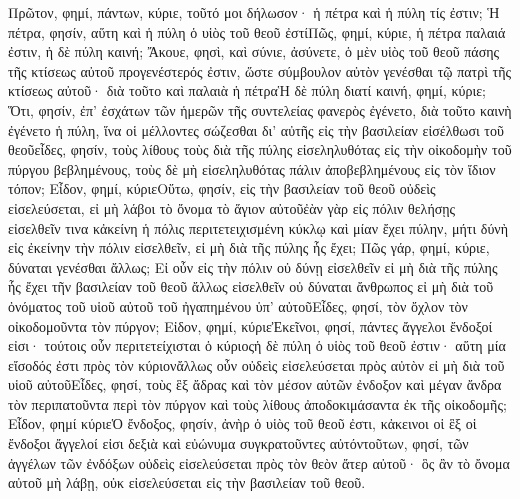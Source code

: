 Πρῶτον, φημί, πάντων, κύριε, τοῦτό μοι δήλωσον· ἡ πέτρα καὶ ἡ πύλη τίς ἐστιν; Ἡ πέτρα, φησίν, αὕτη καὶ ἡ πύλη ὁ υἱὸς τοῦ θεοῦ ἐστίΠῶς, φημί, κύριε, ἡ πέτρα παλαιά ἐστιν, ἡ δὲ πύλη καινή; Ἄκουε, φησὶ, καὶ σύνιε, ἀσύνετε, ὁ μὲν υἱὸς τοῦ θεοῦ πάσης τῆς κτίσεως αὐτοῦ προγενέστερός ἐστιν, ὥστε σύμβουλον αὐτὸν γενέσθαι τῷ πατρὶ τῆς κτίσεως αὐτοῦ· διὰ τοῦτο καὶ παλαιὰ ἡ πέτραἩ δὲ πύλη διατί καινή, φημί, κύριε; Ὅτι, φησίν, ἐπ’ ἐσχάτων τῶν ἡμερῶν τῆς συντελείας φανερὸς ἐγένετο, διὰ τοῦτο καινὴ ἐγένετο ἡ πύλη, ἵνα οἱ μέλλοντες σώζεσθαι δι’ αὐτῆς εἰς τὴν βασιλείαν εἰσέλθωσι τοῦ θεοῦεἶδες, φησίν, τοὺς λίθους τοὺς διὰ τῆς πύλης εἰσεληλυθότας εἰς τὴν οἰκοδομὴν τοῦ πύργου βεβλημένους, τοὺς δὲ μὴ εἰσεληλυθότας πάλιν ἀποβεβλημένους εἰς τὸν ἴδιον τόπον; Εἶδον, φημί, κύριεΟὕτω, φησίν, εἰς τὴν βασιλείαν τοῦ θεοῦ οὐδεὶς εἰσελεύσεται, εἰ μὴ λάβοι τὸ ὄνομα τὸ ἅγιον αὐτοῦἐὰν γὰρ εἰς πόλιν θελήσῃς εἰσελθεῖν τινα κἀκείνη ἡ πόλις περιτετειχισμένη κύκλῳ καὶ μίαν ἔχει πύλην, μήτι δύνὴ εἰς ἐκείνην τὴν πόλιν εἰσελθεῖν, εἰ μὴ διὰ τῆς πύλης ἧς ἔχει; Πῶς γάρ, φημί, κύριε, δύναται γενέσθαι ἄλλως; Εἰ οὖν εἰς τὴν πόλιν οὐ δύνῃ εἰσελθεῖν εἰ μὴ διὰ τῆς πύλης ἧς ἔχει τῆν βασιλείαν τοῦ θεοῦ ἄλλως εἰσελθεῖν οὐ δύναται ἄνθρωπος εἰ μὴ διὰ τοῦ ὀνόματος τοῦ υἱοῦ αὐτοῦ τοῦ ἠγαπημένου ὑπ’ αὐτοῦΕἶδες, φησί, τὸν ὄχλον τὸν οἰκοδομοῦντα τὸν πύργον; Εἰδον, φημί, κύριεἘκεῖνοι, φησί, πάντες ἄγγελοι ἔνδοξοί εἰσι· τούτοις οὖν περιτετείχισται ὁ κύριοςἡ δὲ πύλη ὁ υἱὸς τοῦ θεοῦ ἐστιν· αὕτη μία εἴσοδός ἐστι πρὸς τὸν κύριονἄλλως οὖν οὐδεὶς εἰσελεύσεται πρὸς αὐτὸν εἰ μὴ διὰ τοῦ υἱοῦ αὐτοῦΕἶδες, φησί, τοὺς ἓξ ἄδρας καὶ τὸν μέσον αὐτῶν ἐνδοξον καὶ μέγαν ἄνδρα τὸν περιπατοῦντα περὶ τὸν πύργον καὶ τοὺς λίθους ἀποδοκιμάσαντα ἐκ τῆς οἰκοδομῆς; Εἶδον, φημί κύριεὉ ἔνδοξος, φησίν, ἀνὴρ ὁ υἱὸς τοῦ θεοῦ ἐστι, κἀκεινοι οἱ ἓξ οἱ ἔνδοξοι ἄγγελοί εἰσι δεξιὰ καὶ εὐώνυμα συγκρατοῦντες αὐτόντοῦτων, φησί, τῶν ἀγγέλων τῶν ἐνδόξων οὐδεὶς εἰσελεύσεται πρὸς τὸν θεὸν ἄτερ αὐτοῦ· ὃς ἂν τὸ ὄνομα αὐτοῦ μὴ λάβῃ, οὐκ εἰσελεύσεται εἰς τὴν βασιλείαν τοῦ θεοῦ.
